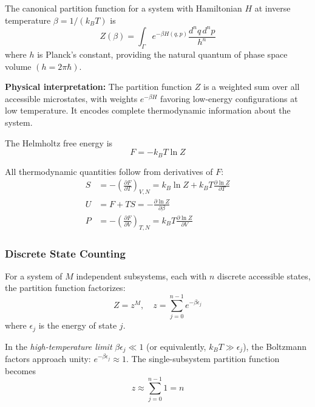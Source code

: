 \documentclass[twocolumn,10pt]{article}
\theoremstyle{remark}
\begin{document}
The canonical partition function for a system with Hamiltonian $H$ at inverse temperature $\beta = 1/(k_B T)$ is
\begin{equation}
    Z(\beta) = \int_\Gamma e^{-\beta H(q,p)} \frac{d^n q \, d^n p}{h^n}
    \label{eq:partition_function}
\end{equation}
where $h$ is Planck's constant, providing the natural quantum of phase space volume $(h = 2\pi\hbar)$.

\textbf{Physical interpretation:} The partition function $Z$ is a weighted sum over all accessible microstates, with weights $e^{-\beta H}$ favoring low-energy configurations at low temperature. It encodes complete thermodynamic information about the system.

The Helmholtz free energy is
\begin{equation}
    F = -k_B T \ln Z
    \label{eq:free_energy}
\end{equation}

All thermodynamic quantities follow from derivatives of $F$:
\begin{align}
    S &= -\left(\frac{\partial F}{\partial T}\right)_{V,N} = k_B \ln Z + k_B T \frac{\partial \ln Z}{\partial T} \label{eq:entropy_from_F} \\
    U &= F + TS = -\frac{\partial \ln Z}{\partial \beta} \label{eq:energy_from_Z} \\
    P &= -\left(\frac{\partial F}{\partial V}\right)_{T,N} = k_B T \frac{\partial \ln Z}{\partial V} \label{eq:pressure_from_F}
\end{align}

\subsubsection{Discrete State Counting}

For a system of $M$ independent subsystems, each with $n$ discrete accessible states, the partition function factorizes:
\begin{equation}
    Z = z^M, \quad z = \sum_{j=0}^{n-1} e^{-\beta \epsilon_j}
    \label{eq:factorized_partition}
\end{equation}
where $\epsilon_j$ is the energy of state $j$.

In the \textit{high-temperature limit} $\beta \epsilon_j \ll 1$ (or equivalently, $k_B T \gg \epsilon_j$), the Boltzmann factors approach unity: $e^{-\beta \epsilon_j} \approx 1$. The single-subsystem partition function becomes
\begin{equation}
    z \approx \sum_{j=0}^{n-1} 1 = n
    \label{eq:high_temp_partition}
\end{equation}
\end{document}
